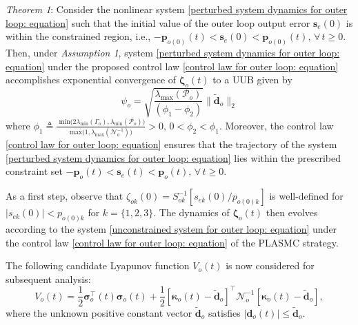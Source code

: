 \documentclass[lettersize,journal]{IEEEtran}
\begin{document}
\textit{Theorem 1}:
Consider the nonlinear system \eqref{perturbed system dynamics for outer loop: equation} such that the initial value of the outer loop output error $\boldsymbol{s}_e(0)$ is within the constrained region, i.e., $- \boldsymbol{p}_{o (0)}(t) < \boldsymbol{s}_{e}(0) < \boldsymbol{p}_{o (0)}(t), \, \forall \, t \geq 0$. Then, under \textit{Assumption 1}, system \eqref{perturbed system dynamics for outer loop: equation} under the proposed control law \eqref{control law for outer loop: equation} accomplishes exponential convergence of $\boldsymbol{\zeta}_o(t)$ to a UUB given by
\begin{equation}
    \psi_o {=} \sqrt{\frac{\lambda_{\text{max}}(\mathcal{P}_o)}{\left(\phi_1 - \phi_2\right)}} \lVert \tilde{\boldsymbol{d}}_{o} \rVert_2
\end{equation}
where $\phi_1 \triangleq \frac{\text{ min}\big(2 \lambda_{\text{min}}\left(\Gamma_o \right),\lambda_{\text{min}}\left(\mathcal{P}_o \right)\big)}{\text{max}\big(1,\lambda_{\text{max}}\left(\mathcal{N}_o^{-1} \right)\big)}>0$, $0<\phi_2<\phi_1$. Moreover, the control law \eqref{control law for outer loop: equation} ensures that the trajectory of the system \eqref{perturbed system dynamics for outer loop: equation} lies within the prescribed constraint set $- \boldsymbol{p}_{o}(t) < \boldsymbol{s}_{e}(t) < \boldsymbol{p}_{o}(t), \, \forall \, t \geq 0$.

As a first step, observe that $\zeta_{ok}(0) = S_{ok}^{-1} [s_{ek}(0)/p_{o(0)k}]$ is well-defined for $\lvert s_{ek}(0) \rvert < p_{o(0)k}$ for $k = \{1, 2, 3\}$. The dynamics of $\boldsymbol{\zeta}_o(t)$ then evolves according to the system \eqref{unconstrained system for outer loop: equation} under the control law \eqref{control law for outer loop: equation} of the PLASMC strategy.

\noindent The following candidate Lyapunov function $V_o(t)$ is now considered for subsequent analysis:
\begin{equation} \label{Lyapunov function for outer loop: equation}
    V_o(t) = \frac{1}{2}\boldsymbol{\sigma}_o^{\top}(t)\boldsymbol{\sigma}_o(t) + \frac{1}{2} \left[\boldsymbol{\kappa}_o(t) - \tilde{\boldsymbol{d}}_{o}\right]^{\top} \mathcal{N}_o^{-1} \left[\boldsymbol{\kappa}_o(t) - \tilde{\boldsymbol{d}}_{o}\right],
\end{equation}
where the unknown positive constant vector $\tilde{\boldsymbol{d}}_{o}$ satisfies $\lvert \boldsymbol{d}_o(t) \rvert \leq \tilde{\boldsymbol{d}}_{o}$.
\end{document}
